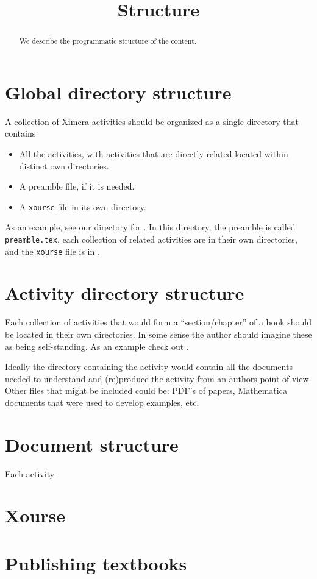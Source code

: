 \documentclass{ximera}
\title{Structure}
\begin{document}
\begin{abstract}
  We describe the programmatic structure of the content.
\end{abstract}
\maketitle

\section{Global directory structure}


A collection of Ximera activities should be organized as a single
directory that contains
\begin{itemize}
\item All the activities, with activities that are directly related
  located within distinct own directories.
\item A preamble file, if it is needed.
\item A \texttt{xourse} file in its own directory.
\end{itemize}
As an example, see our directory for
. In this
directory, the preamble is called \texttt{preamble.tex}, each
collection of related activities are in their own directories, and the
\texttt{xourse} file is in
.

\section{Activity directory structure}

Each collection of activities that would form a ``section/chapter'' of a
book should be located in their own directories. In some sense the
author should imagine these as being self-standing. As an example check out
.

Ideally the directory containing the activity would contain all the
documents needed to understand and (re)produce the activity from an
authors point of view. Other files that might be included could be:
PDF's of papers, Mathematica documents that were used to develop
examples, etc.

\section{Document structure}

Each activity 



\section{Xourse}


\section{Publishing textbooks}
\end{document}
